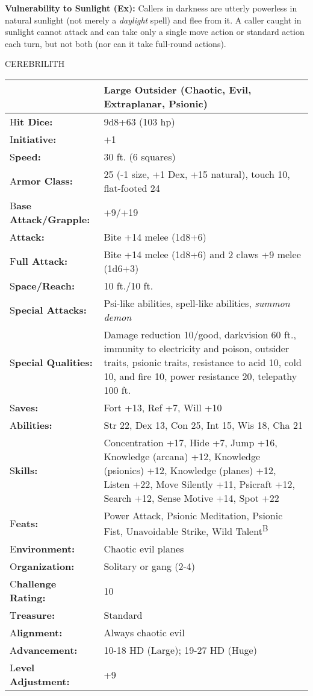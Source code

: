 \documentclass{article}
\begin{document}
\textbf{Vulnerability to Sunlight (Ex): }Callers in darkness are utterly powerless 
in natural sunlight (not merely a \textit{daylight }spell) and flee from it. A 
caller caught in sunlight cannot attack and can take only a single move action 
or standard action each turn, but  not both (nor can it take full-round actions).

\vspace{12pt}
{\LARGE{}CEREBRILITH}

\begin{tabular}{|>{\raggedright}p{54pt}|>{\raggedright}p{271pt}|}
\hline
  & Large Outsider (Chaotic, Evil, Extraplanar, Psionic)\tabularnewline
\hline
H\textbf{it Dice:} & 9d8+63 (103 hp)\tabularnewline
\hline
I\textbf{nitiative:} & +1\tabularnewline
\hline
S\textbf{peed:} & 30 ft. (6 squares)\tabularnewline
\hline
A\textbf{rmor Class:} & 25 (-1 size, +1 Dex, +15 natural), touch 10, flat-footed 
24\tabularnewline
\hline
B\textbf{ase Attack/Grapple:} & +9/+19\tabularnewline
\hline
A\textbf{ttack:} & Bite +14 melee (1d8+6)\tabularnewline
\hline
F\textbf{ull Attack:} & Bite +14 melee (1d8+6) and 2 claws +9 melee (1d6+3)\tabularnewline
\hline
S\textbf{pace/Reach:} & 10 ft./10 ft.\tabularnewline
\hline
S\textbf{pecial Attacks:} & Psi-like abilities, spell-like abilities, \textit{summon 
demon}\tabularnewline
\hline
S\textbf{pecial Qualities:} & Damage reduction 10/good, darkvision 60 ft., immunity 
to electricity and poison, outsider traits, psionic traits, resistance to acid 
10, cold 10, and fire 10, power resistance 20, telepathy 100 ft.\tabularnewline
\hline
S\textbf{aves:} & Fort +13, Ref +7, Will +10\tabularnewline
\hline
A\textbf{bilities:} & Str 22, Dex 13, Con 25, Int 15, Wis 18, Cha 21\tabularnewline
\hline
S\textbf{kills:} & Concentration +17, Hide +7, Jump +16, Knowledge (arcana) +12, 
Knowledge (psionics) +12, Knowledge (planes) +12, Listen +22, Move Silently +11, 
Psicraft +12, Search +12, Sense Motive +14, Spot +22\tabularnewline
\hline
F\textbf{eats:} & Power Attack, Psionic Meditation, Psionic Fist, Unavoidable Strike, 
Wild Talent\textsuperscript{B}\tabularnewline
\hline
E\textbf{nvironment:} & Chaotic evil planes\tabularnewline
\hline
O\textbf{rganization:} & Solitary or gang (2-4)\tabularnewline
\hline
C\textbf{hallenge Rating:} & 10\tabularnewline
\hline
T\textbf{reasure:} & Standard\tabularnewline
\hline
A\textbf{lignment:} & Always chaotic evil\tabularnewline
\hline
A\textbf{dvancement:} & 10-18 HD (Large); 19-27 HD (Huge)\tabularnewline
\hline
L\textbf{evel Adjustment:} & +9\tabularnewline
\hline
\end{tabular}
\end{document}
